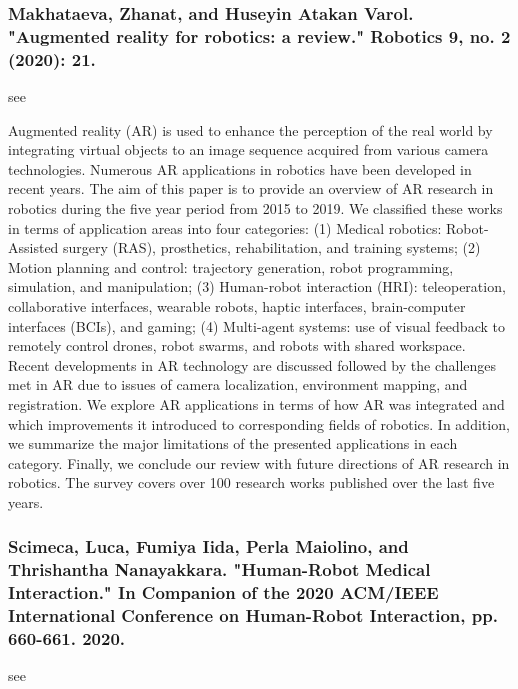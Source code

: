 \documentclass[conference]{IEEEtran}
\begin{document}
\medskip
\subsubsection{Makhataeva, Zhanat, and Huseyin Atakan Varol. "Augmented reality for robotics: a review." Robotics 9, no. 2 (2020): 21.}
see \cite{makhataeva2020augmented}

Augmented reality (AR) is used to enhance the perception of the real world by integrating virtual objects to an image sequence acquired from various camera technologies. Numerous AR applications in robotics have been developed in recent years. The aim of this paper is to provide an overview of AR research in robotics during the five year period from 2015 to 2019. We classified these works in terms of application areas into four categories: (1) Medical robotics: Robot-Assisted surgery (RAS), prosthetics, rehabilitation, and training systems; (2) Motion planning and control: trajectory generation, robot programming, simulation, and manipulation; (3) Human-robot interaction (HRI): teleoperation, collaborative interfaces, wearable robots, haptic interfaces, brain-computer interfaces (BCIs), and gaming; (4) Multi-agent systems: use of visual feedback to remotely control drones, robot swarms, and robots with shared workspace. Recent developments in AR technology are discussed followed by the challenges met in AR due to issues of camera localization, environment mapping, and registration. We explore AR applications in terms of how AR was integrated and which improvements it introduced to corresponding fields of robotics. In addition, we summarize the major limitations of the presented applications in each category. Finally, we conclude our review with future directions of AR research in robotics. The survey covers over 100 research works published over the last five years.

\medskip
\subsubsection{Scimeca, Luca, Fumiya Iida, Perla Maiolino, and Thrishantha Nanayakkara. "Human-Robot Medical Interaction." In Companion of the 2020 ACM/IEEE International Conference on Human-Robot Interaction, pp. 660-661. 2020.}
see \cite{scimeca2020human}
\end{document}

